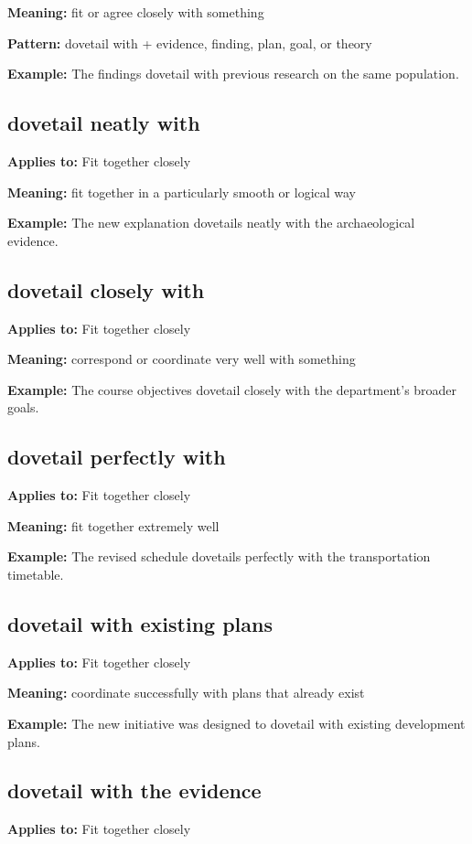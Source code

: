 \documentclass[11pt]{article}
\begin{document}
\textbf{Meaning:} fit or agree closely with something

\textbf{Pattern:} dovetail with + evidence, finding, plan, goal, or theory

\textbf{Example:} The findings dovetail with previous research on the same population.

\subsection{dovetail neatly with}
\textbf{Applies to:} Fit together closely

\textbf{Meaning:} fit together in a particularly smooth or logical way

\textbf{Example:} The new explanation dovetails neatly with the archaeological evidence.

\subsection{dovetail closely with}
\textbf{Applies to:} Fit together closely

\textbf{Meaning:} correspond or coordinate very well with something

\textbf{Example:} The course objectives dovetail closely with the department's broader goals.

\subsection{dovetail perfectly with}
\textbf{Applies to:} Fit together closely

\textbf{Meaning:} fit together extremely well

\textbf{Example:} The revised schedule dovetails perfectly with the transportation timetable.

\subsection{dovetail with existing plans}
\textbf{Applies to:} Fit together closely

\textbf{Meaning:} coordinate successfully with plans that already exist

\textbf{Example:} The new initiative was designed to dovetail with existing development plans.

\subsection{dovetail with the evidence}
\textbf{Applies to:} Fit together closely
\end{document}
